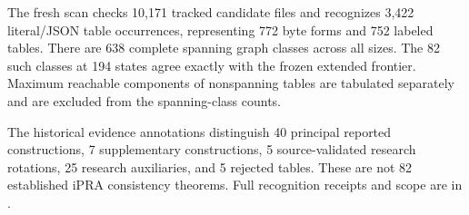 The fresh scan checks 10,171 tracked candidate files and recognizes 3,422 literal/JSON table occurrences, representing 772 byte forms and 752 labeled tables. There are 638 complete spanning graph classes across all sizes. The 82 such classes at 194 states agree exactly with the frozen extended frontier. Maximum reachable components of nonspanning tables are tabulated separately and are excluded from the spanning-class counts.

The historical evidence annotations distinguish 40 principal reported constructions, 7 supplementary constructions, 5 source-validated research rotations, 25 research auxiliaries, and 5 rejected tables. These are not 82 established iPRA consistency theorems. Full recognition receipts and scope are in .
